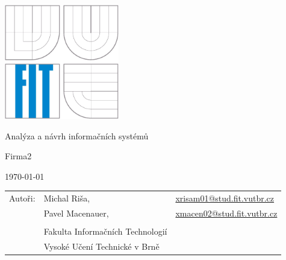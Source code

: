\documentclass[12pt,a4paper,titlepage,final]{report}
\makeatletter
\newcommand\Course{Analýza a návrh informačních systémů}
\newcommand\WorkTitle{Firma2}
\newcommand\AuthorA{Michal Riša}
\newcommand\AuthorAEmail{xrisam01@stud.fit.vutbr.cz}
\newcommand\AuthorB{Pavel Macenauer}
\newcommand\AuthorBEmail{xmacen02@stud.fit.vutbr.cz}
\newcommand\Faculty{Fakulta Informačních Technologií}
\newcommand\School{Vysoké Učení Technické v Brně}
\makeatother
\begin{document}
	\begin{titlepage}
	\begin{center}
		\includegraphics[height=5cm]{img/logo.eps}
	\end{center}
	\vfill
	\begin{center}
		\begin{Large}
			\Course\\
		\end{Large}
		\bigskip
		\begin{Huge}
			\WorkTitle\\
		\end{Huge}
	\end{center}
	\vfill
	\begin{center}
		\begin{large}
			\today
		\end{large}
	\end{center}
	\vfill
	\begin{flushleft}
		\begin{large}
			\begin{tabular}{lll}
				Autoři: & \AuthorA, & \url{\AuthorAEmail} \\
				        & \AuthorB, & \url{\AuthorBEmail} \\
				& & \\
				& \Faculty \\
				& \School \\
			\end{tabular}
		\end{large}
	\end{flushleft}
\end{titlepage}		
	
	
\tableofcontents

\end{document}

